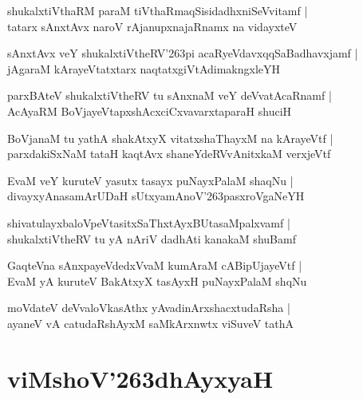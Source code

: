 \documentclass[twoside,12pt,openright]{book}
\def\S{\char'263}
\newcounter{shloka}[chapter]
\begin{document}
\begin{shloka}
shukalxtiVthaRM paraM tiVthaRmaqSisidadhxniSeVvitamf |\\
tatarx sAnxtAvx naroV rAjanupxnajaRnamx na vidayxteV 
\end{shloka}

\begin{shloka}
sAnxtAvx veY shukalxtiVtheRV\S pi acaRyeVdavxqqSaBadhavxjamf |\\
jAgaraM kArayeVtatxtarx naqtatxgiVtAdimakngxleYH 
\end{shloka}

\begin{shloka}
parxBAteV shukalxtiVtheRV tu sAnxnaM veY deVvatAcaRnamf |\\
AcAyaRM BoVjayeVtapxshAcxciCxvavarxtaparaH shuciH
\end{shloka}

\begin{shloka}
BoVjanaM tu yathA shakAtxyX vitatxshaThayxM na kArayeVtf |\\
parxdakiSxNaM tataH kaqtAvx shaneYdeRVvAnitxkaM verxjeVtf 
\end{shloka}

\begin{shloka}
EvaM veY kuruteV yasutx tasayx puNayxPalaM shaqNu |\\
divayxyAnasamArUDaH sUtxyamAnoV\S pasxroVgaNeYH
\end{shloka}

\begin{shloka}
shivatulayxbaloVpeVtasitxSaThxtAyxBUtasaMpalxvamf |\\
shukalxtiVtheRV tu yA nAriV dadhAti kanakaM shuBamf 
\end{shloka}


\begin{shloka}
GaqteVna sAnxpayeVdedxVvaM kumAraM cABipUjayeVtf |\\
EvaM yA kuruteV BakAtxyX tasAyxH puNayxPalaM shqNu
\end{shloka}

\begin{shloka}
moVdateV deVvaloVkasAthx yAvadinArxshacxtudaRsha |\\
ayaneV vA catudaRshAyxM saMkArxnwtx viSuveV tathA 
\end{shloka}

\chapter{viMshoV\S dhAyxyaH}
\end{document}
